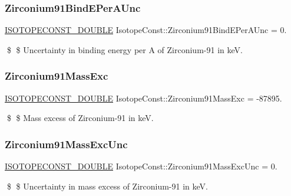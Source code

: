 \subsubsection{\texorpdfstring{Zirconium91\+Bind\+E\+Per\+A\+Unc}{Zirconium91BindEPerAUnc}}
{\footnotesize\ttfamily \mbox{\hyperlink{group___isotope_const-_macros_ga8f45a7272ce02c0b4c65c44636ed719a}{I\+S\+O\+T\+O\+P\+E\+C\+O\+N\+S\+T\+\_\+\+D\+O\+U\+B\+LE}} Isotope\+Const\+::\+Zirconium91\+Bind\+E\+Per\+A\+Unc = 0.}

\$ \$ Uncertainty in binding energy per A of Zirconium-\/91 in keV. \mbox{\label{group___isotope_const-_zirconium-_zr91_gab5fcda4e2f2a50bb269673aff2ce85ae}} 
\subsubsection{\texorpdfstring{Zirconium91\+Mass\+Exc}{Zirconium91MassExc}}
{\footnotesize\ttfamily \mbox{\hyperlink{group___isotope_const-_macros_ga8f45a7272ce02c0b4c65c44636ed719a}{I\+S\+O\+T\+O\+P\+E\+C\+O\+N\+S\+T\+\_\+\+D\+O\+U\+B\+LE}} Isotope\+Const\+::\+Zirconium91\+Mass\+Exc = -\/87895.}

\$ \$ Mass excess of Zirconium-\/91 in keV. \mbox{\label{group___isotope_const-_zirconium-_zr91_ga50bab22257807f440968180dac6db822}} 
\subsubsection{\texorpdfstring{Zirconium91\+Mass\+Exc\+Unc}{Zirconium91MassExcUnc}}
{\footnotesize\ttfamily \mbox{\hyperlink{group___isotope_const-_macros_ga8f45a7272ce02c0b4c65c44636ed719a}{I\+S\+O\+T\+O\+P\+E\+C\+O\+N\+S\+T\+\_\+\+D\+O\+U\+B\+LE}} Isotope\+Const\+::\+Zirconium91\+Mass\+Exc\+Unc = 0.}

\$ \$ Uncertainty in mass excess of Zirconium-\/91 in keV. \mbox{\label{group___isotope_const-_zirconium-_zr91_gabcca74c6a2f5a0a0450e366c1afd947c}} 
